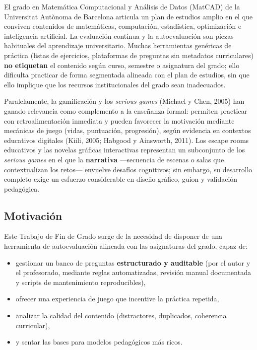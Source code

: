 \documentclass[11pt,a4paper]{article}
\begin{document}
El grado en Matemática Computacional y Análisis de Datos (MatCAD) de la Universitat Autònoma de Barcelona articula un plan de estudios amplio en el que conviven contenidos de matemáticas, computación, estadística, optimización e inteligencia artificial. La evaluación continua y la autoevaluación son piezas habituales del aprendizaje universitario. Muchas herramientas genéricas de práctica (listas de ejercicios, plataformas de preguntas sin metadatos curriculares) \textbf{no etiquetan} el contenido según curso, semestre o asignatura del grado; ello dificulta practicar de forma segmentada alineada con el plan de estudios, sin que ello implique que los recursos institucionales del grado sean inadecuados.

Paralelamente, la gamificación y los \textit{serious games} (Michael y Chen, 2005) han ganado relevancia como complemento a la enseñanza formal: permiten practicar con retroalimentación inmediata y pueden favorecer la motivación mediante mecánicas de juego (vidas, puntuación, progresión), según evidencia en contextos educativos digitales (Kiili, 2005; Habgood y Ainsworth, 2011). Los escape rooms educativos y las novelas gráficas interactivas representan un subconjunto de los \textit{serious games} en el que la \textbf{narrativa} ---secuencia de escenas o salas que contextualizan los retos--- envuelve desafíos cognitivos; sin embargo, su desarrollo completo exige un esfuerzo considerable en diseño gráfico, guion y validación pedagógica.

\subsection{Motivación}

Este Trabajo de Fin de Grado surge de la necesidad de disponer de una herramienta de autoevaluación alineada con las asignaturas del grado, capaz de:
\begin{itemize}
  \item gestionar un banco de preguntas \textbf{estructurado y auditable} (por el autor y el profesorado, mediante reglas automatizadas, revisión manual documentada y scripts de mantenimiento reproducibles),
  \item ofrecer una experiencia de juego que incentive la práctica repetida,
  \item analizar la calidad del contenido (distractores, duplicados, coherencia curricular),
  \item y sentar las bases para modelos pedagógicos más ricos.
\end{itemize}
\end{document}
